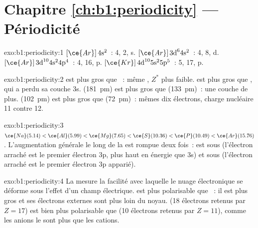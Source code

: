 \section*{Chapitre \ref{ch:b1:periodicity} --- Périodicité}

\begin{solution}{exo:b1:periodicity:1}
 $[\ce{Ar}]\,4\text{s}^2$~:  4,  2,  s. 
$[\ce{Ar}]\,3\text{d}^6 4\text{s}^2$~:  4,  8,  d. 
$[\ce{Ar}]\,3\text{d}^{10} 4\text{s}^2 4\text{p}^4$~:  4,  16,
 p.  $[\ce{Kr}]\,4\text{d}^{10} 5\text{s}^2 5\text{p}^5$~:
 5,  17,  p.
\end{solution}

\begin{solution}{exo:b1:periodicity:2}
 est plus gros que ~: même , $Z^{*}$ plus faible.
 est plus gros que , qui a perdu sa couche 3s. 
(\qty{181}{pm}) est plus gros que  (\qty{133}{pm})~: une couche de
plus.  (\qty{102}{pm}) est plus gros que 
(\qty{72}{pm})~: mêmes dix électrons, charge nucléaire 11 contre 12.
\end{solution}

\begin{solution}{exo:b1:periodicity:3}
$\ce{Na} (5.14) < \ce{Al} (5.99) < \ce{Mg} (7.65) < \ce{S} (10.36) <
\ce{P} (10.49) < \ce{Ar} (15.76)$. L'augmentation générale le long de la
 est rompue deux fois~:  est sous  (l'électron
arraché est le premier électron 3p, plus haut en énergie que 3s) et
 sous  (l'électron arraché est le premier électron 3p
apparié).
\end{solution}

\begin{solution}{exo:b1:periodicity:4}
La  mesure la facilité avec laquelle le nuage électronique
se déforme sous l'effet d'un champ électrique.  est plus
polarisable que ~: il est plus gros et ses électrons externes sont
plus loin du noyau.  (18 électrons retenus par $Z = 17$) est
bien plus polarisable que  (10 électrons retenus par $Z = 11$),
comme les anions le sont plus que les cations.
\end{solution}

